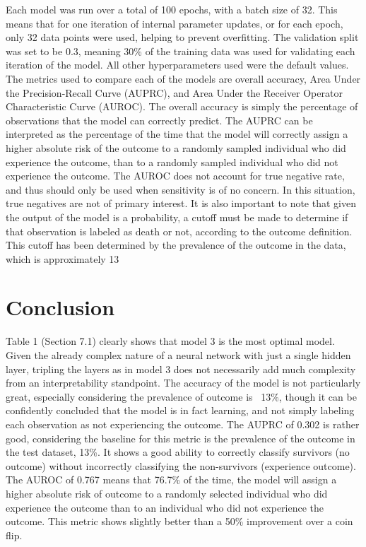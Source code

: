 \documentclass{article}
\begin{document}
\begin{multicols}{2}
Each model was run over a total of 100 epochs, with a batch size of 32. This means that for one iteration of internal parameter updates, or for each epoch, only 32 data points were used, helping to prevent overfitting. The validation split was set to be 0.3, meaning 30\% of the training data was used for validating each iteration of the model.
All other hyperparameters used were the default values. 
The metrics used to compare each of the models are overall accuracy, Area Under the Precision-Recall Curve (AUPRC), and Area Under the Receiver Operator Characteristic Curve (AUROC). The overall accuracy is simply the percentage of observations that the model can correctly predict. The AUPRC can be interpreted as the percentage of the time that the model will correctly assign a higher absolute risk of the outcome to a randomly sampled individual who did experience the outcome, than to a randomly sampled individual who did not experience the outcome. The AUROC does not account for true negative rate, and thus should only be used when sensitivity is of no concern. In this situation, true negatives are not of primary interest. 
It is also important to note that given the output of the model is a probability, a cutoff must be made to determine if that observation is labeled as death or not, according to the outcome definition. This cutoff has been determined by the prevalence of the outcome in the data, which is approximately 13%


\section{Conclusion}
Table 1 (Section 7.1) clearly shows that model 3 is the most optimal model. Given the already complex nature of a neural network with just a single hidden layer, tripling the layers as in model 3 does not necessarily add much complexity from an interpretability standpoint. The accuracy of the model is not particularly great, especially considering the prevalence of outcome is ~13\%, though it can be confidently concluded that the model is in fact learning, and not simply labeling each observation as not experiencing the outcome. The AUPRC of 0.302 is rather good, considering the baseline for this metric is the prevalence of the outcome in the test dataset, 13\%. It shows a good ability to correctly classify survivors (no outcome) without incorrectly classifying the non-survivors (experience outcome). The AUROC of 0.767 means that 76.7\% of the time, the model will assign a higher absolute risk of outcome to a randomly selected individual who did experience the outcome than to an individual who did not experience the outcome. This metric shows slightly better than a 50\% improvement over a coin flip. 



\end{multicols}
\end{document}
